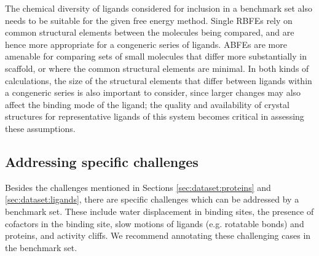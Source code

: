 \documentclass[9pt,bestpractices]{livecoms}
\begin{document}
The chemical diversity of ligands considered for inclusion in a benchmark set also needs to be suitable for the given free energy method. 
Single RBFEs rely on common structural elements between the molecules being compared, and are hence more appropriate for a congeneric series of ligands. 
%
ABFEs are more amenable for comparing sets of small molecules that differ more substantially in scaffold, or where the common structural elements are minimal. 
In both kinds of calculations, the size of the structural elements that differ between ligands within a congeneric series is also important to consider, since larger changes may also affect the binding mode of the ligand; the quality and availability of crystal structures for representative ligands of this system becomes critical in assessing these assumptions.

\subsection{Addressing specific challenges}
\label{sec:dataset:challenges}

Besides the challenges mentioned in Sections \ref{sec:dataset:proteins} and \ref{sec:dataset:ligands},
there are specific challenges which can be addressed by a benchmark set. These include 
water displacement in binding sites,
the presence of cofactors in the binding site, 
slow motions of ligands (e.g. rotatable bonds) and proteins, and 
activity cliffs.
We recommend annotating these challenging cases in the benchmark set.







\end{document}
